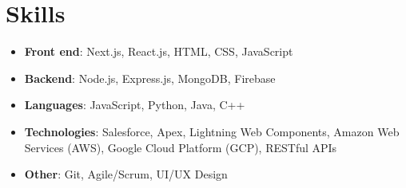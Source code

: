 \documentclass[letterpaper, 9pt]{extarticle}
\begin{document}
\section{Skills}
\begin{itemize}
\item \textbf{Front end}: Next.js, React.js, HTML, CSS, JavaScript
\item \textbf{Backend}: Node.js, Express.js, MongoDB, Firebase
\item \textbf{Languages}: JavaScript, Python, Java, C++
\item \textbf{Technologies}: Salesforce, Apex, Lightning Web Components, Amazon Web Services (AWS), Google Cloud Platform (GCP), RESTful APIs
\item \textbf{Other}: Git, Agile/Scrum, UI/UX Design
\end{itemize}
\end{document}

